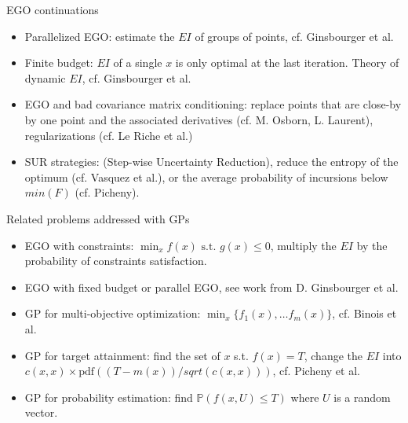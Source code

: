 \documentclass{beamer}
\begin{document}
\begin{frame}{}
\begin{exampleblock}{EGO continuations}
\begin{itemize}
\item Parallelized EGO: estimate the $EI$ of groups of points, cf. Ginsbourger et al. 
\item Finite budget: $EI$ of a single $x$ is only optimal at the last iteration. Theory of dynamic $EI$, cf. Ginsbourger et al.
\item EGO and bad covariance matrix conditioning: replace points that are close-by by one point and the associated derivatives (cf. M. Osborn, L. Laurent), regularizations (cf. Le Riche et al.)
\item SUR strategies: (Step-wise Uncertainty Reduction), reduce the entropy of the optimum (cf. Vasquez et al.), or the average probability of incursions below $min(F)$ (cf. Picheny).
\end{itemize}
\end{exampleblock}
\end{frame}

\begin{frame}{}
\begin{exampleblock}{Related problems addressed with GPs}
\begin{itemize}
\item EGO with constraints: $\min_x f(x) \text{ s.t. } g(x) \le 0$, multiply the $EI$ by the probability of constraints satisfaction.
\item EGO with fixed budget or parallel EGO, see work from D. Ginsbourger et al.
\item GP for multi-objective optimization: $\min_x \{f_1(x), \dots f_m(x)\}$, cf. Binois et al.
\item GP for target attainment: find the set of $x$ s.t. $f(x) = T$, change the $EI$ into $c(x,x) \times \text{pdf}\left((T-m(x))/sqrt(c(x,x))\right)$, cf. Picheny et al.
\item GP for probability estimation: find $\mathds P (f(x,U)\le T) $ where $U$ is a random vector.
\end{itemize}
\end{exampleblock}
\end{frame}
\end{document}
